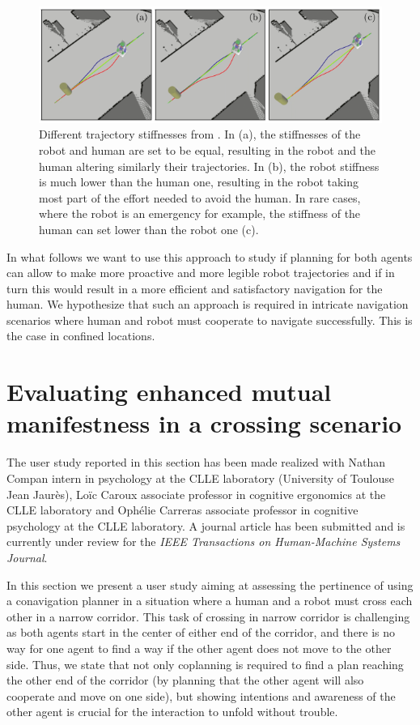 \documentclass[a4paper,11pt,twoside]{StyleThese}
\begin{document}
\begin{figure}[hbtp]
\centering
\includegraphics[width=\textwidth]{figures/chapter2/hateb_effort.png}
\caption{Different trajectory stiffnesses from \cite{khambhaita_viewing_2017}. In (a), the stiffnesses of the robot and human are set to be equal, resulting in the robot and the human altering similarly their trajectories. In (b), the robot stiffness is much lower than the human one, resulting in the robot taking most part of the effort needed to avoid the human. In rare cases, where the robot is an emergency for example, the stiffness of the human can set lower than the robot one (c).}
\label{fig:hateb_effort}
\end{figure}

In what follows we want to use this approach to study if planning for both agents can allow to make more proactive and more legible robot trajectories and if in turn this would result in a more efficient and satisfactory navigation for the human. We hypothesize that such an approach is required in intricate navigation scenarios where human and robot must cooperate to navigate successfully. This is the case in confined locations.

\section[Evaluation Through a User Study]{Evaluating enhanced mutual manifestness in a crossing scenario}

The user study reported in this section has been made realized with Nathan Compan intern in psychology at the CLLE laboratory (University of Toulouse Jean Jaurès), Lo\"ic Caroux associate professor in cognitive ergonomics at the CLLE laboratory and Ophélie Carreras associate professor in cognitive psychology at the CLLE laboratory. A journal article has been submitted and is currently under review for the \textit{IEEE Transactions on Human-Machine Systems Journal}.

In this section we present a user study aiming at assessing the pertinence of using a conavigation planner in a situation where a human and a robot must cross each other in a narrow corridor. This task of crossing in narrow corridor is challenging as both agents start in the center of either end of the corridor, and there is no way for one agent to find a way if the other agent does not move to the other side. Thus, we state that not only coplanning is required to find a plan reaching the other end of the corridor (by planning that the other agent will also cooperate and move on one side), but showing intentions and awareness of the other agent is crucial for the interaction to unfold without trouble.
\end{document}

